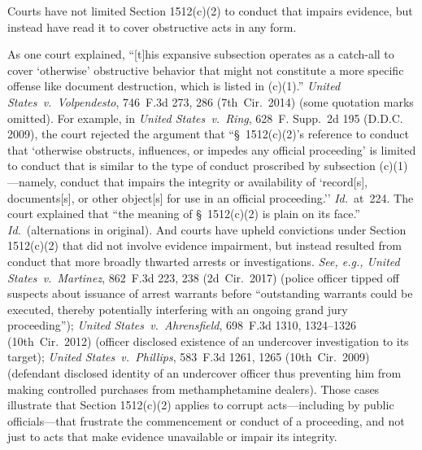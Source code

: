 Courts have not limited Section 1512(c)(2) to conduct that impairs evidence, but instead have read it to cover obstructive acts in any form.

As one court explained, ``[t]his expansive subsection operates as a catch-all to cover `otherwise' obstructive behavior that might not constitute a more specific offense like document destruction, which is listed in (c)(1).''
\textit{United States~v.\ Volpendesto}, 746~F.3d 273, 286 (7th~Cir.~2014) (some quotation marks omitted).
For example, in \textit{United States~v.\ Ring}, 628~F. Supp.~2d 195 (D.D.C. 2009), the court rejected the argument that ``\S~1512(c)(2)'s reference to conduct that `otherwise obstructs, influences, or impedes any official proceeding' is limited to conduct that is similar to the type of conduct proscribed by subsection (c)(1)---namely, conduct that impairs the integrity or availability of `record[s], documents[s], or other object[s] for use in an official proceeding.''
\textit{Id.}~at~224.
The court explained that ``the meaning of \S~1512(c)(2) is plain on its face.''
\textit{Id.}~(alternations in original). And courts have upheld convictions under Section 1512(c)(2) that did not involve evidence impairment, but instead resulted from conduct that more broadly thwarted arrests or investigations.
\textit{See, e.g., United States~v.\ Martinez}, 862~F.3d 223, 238 (2d~Cir.~2017) (police officer tipped off suspects about issuance of arrest warrants before ``outstanding warrants could be executed, thereby potentially interfering with an ongoing grand jury proceeding'');
\textit{United States~v.\ Ahrensfield}, 698~F.3d 1310, 1324--1326 (10th~Cir.~2012) (officer disclosed existence of an undercover investigation to its target);
\textit{United States~v.\ Phillips}, 583~F.3d 1261, 1265 (10th~Cir.~2009) (defendant disclosed identity of an undercover officer thus preventing him from making controlled purchases from methamphetamine dealers).
Those cases illustrate that Section 1512(c)(2) applies to corrupt acts---including by public officials---that frustrate the commencement or conduct of a proceeding, and not just to acts that make evidence unavailable or impair its integrity.

